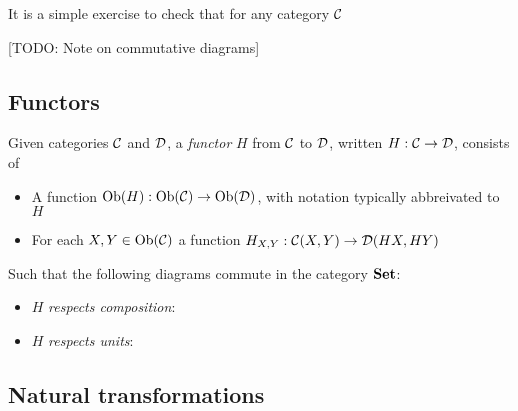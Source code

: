 \begin{remark}
    It is a simple exercise to check that for any category $\mathcal{C}$
\end{remark}

[TODO: Note on commutative diagrams]

\subsection{Functors}

\begin{defin}
    Given categories $\mathcal{C}$ and $\mathcal{D}$, a \textit{functor} $H$ from $\mathcal{C}$ to $\mathcal{D}$, written $H : \mathcal{C} \to \mathcal{D}$, consists of
    \begin{itemize}
        \item A function $\text{Ob}(H) : \text{Ob}(\mathcal{C}) \to \text{Ob}(\mathcal{D})$, with notation typically abbreivated to $H$
        \item For each $X, Y \in \text{Ob}(\mathcal{C})$ a function $H_{X,Y} : \mathcal{C}(X, Y) \to \mathcal{D}(HX,HY)$
    \end{itemize}
    Such that the following diagrams commute in the category ${\normalfont\textbf{Set}}$:
    \begin{itemize}
        \item $H$ \textit{respects composition}:
        \begin{center}
        \end{center}
        \item $H$ \textit{respects units}:
        \begin{center}
        \end{center}
    \end{itemize}
\end{defin}

\subsection{Natural transformations}

